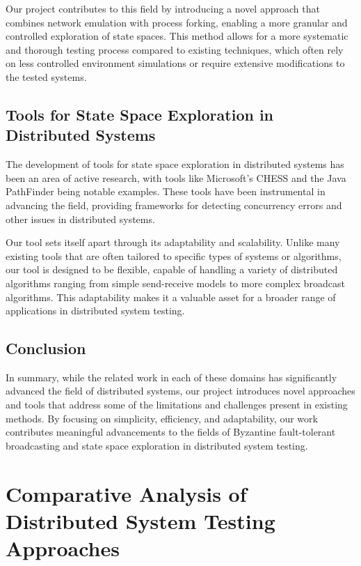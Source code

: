 \documentclass[a4paper,11pt,oneside]{report}
\begin{document}
Our project contributes to this field by introducing a novel approach that combines network emulation with process forking, enabling a more granular and controlled exploration of state spaces. This method allows for a more systematic and thorough testing process compared to existing techniques, which often rely on less controlled environment simulations or require extensive modifications to the tested systems.

\subsection{Tools for State Space Exploration in Distributed Systems}
The development of tools for state space exploration in distributed systems has been an area of active research, with tools like Microsoft's CHESS and the Java PathFinder being notable examples. These tools have been instrumental in advancing the field, providing frameworks for detecting concurrency errors and other issues in distributed systems.

Our tool sets itself apart through its adaptability and scalability. Unlike many existing tools that are often tailored to specific types of systems or algorithms, our tool is designed to be flexible, capable of handling a variety of distributed algorithms ranging from simple send-receive models to more complex broadcast algorithms. This adaptability makes it a valuable asset for a broader range of applications in distributed system testing.

\subsection{Conclusion}
In summary, while the related work in each of these domains has significantly advanced the field of distributed systems, our project introduces novel approaches and tools that address some of the limitations and challenges present in existing methods. By focusing on simplicity, efficiency, and adaptability, our work contributes meaningful advancements to the fields of Byzantine fault-tolerant broadcasting and state space exploration in distributed system testing.

\section{Comparative Analysis of Distributed System Testing Approaches}
\end{document}

